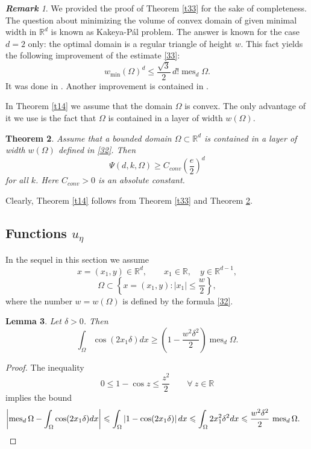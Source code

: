 \documentclass[a4paper,12pt]{article}
\numberwithin{equation}{section}
\def \de{\delta}
\def \O{\Omega}
\def \R{\mathbb{R}}
\def\mes{\operatorname{mes}}
\newcommand{\<}{\langle}
\renewcommand{\>}{\rangle}
\theoremstyle{plain}
\newtheorem{theorem}{\bf Theorem}[section]
\newtheorem{lemma}[theorem]{\bf Lemma}
\theoremstyle{definition}
\theoremstyle{remark}
\newtheorem{rem}[theorem]{\bf Remark}
\renewcommand{\le}{\leqslant}
\renewcommand{\ge}{\geqslant}
\begin{document}
\begin{rem}
We provided the proof of Theorem \ref{t33} for the sake of completeness.
The question about minimizing the volume of convex domain of given minimal width in $\R^d$
is known as Kakeya-P\'al problem.
The answer is known \cite{Pal} for the case $d=2$ only:
the optimal domain is a regular triangle of height $w$.
This fact yields the following improvement of the estimate \eqref{33}:
$$
w_{\min} (\O)^d \le \frac{\sqrt 3}2\, d! \mes_d \O.
$$
It was done in \cite{Firey}.
Another improvement is contained in \cite[the proof of Theorem 6.2]{Bezdek}.
\end{rem}

In Theorem \ref{t14} we assume that the domain $\O$ is convex.
The only advantage of it we use is the fact that $\O$ is contained in a layer
of width $w(\O)$.

\begin{theorem}
\label{t335}
Assume that a bounded domain $\O \subset \R^d$ is contained in a layer
of width $w(\O)$ defined in \eqref{32}.
Then 
\begin{equation*} 
\Psi (d,k,\O) \ge C_{conv} \left(\frac{e}2\right)^d 
\end{equation*}
for all $k$.
Here $C_{conv}>0$ is an absolute constant.
\end{theorem}

Clearly, Theorem \ref{t14} follows from Theorem \ref{t33} and Theorem \ref{t335}.

\subsection{Functions $u_\eta$}
In the sequel in this section we assume
$$
x = (x_1, y) \in \R^d, \qquad x_1 \in \R, \quad y \in \R^{d-1},
$$
$$
\O \subset\left\{x = (x_1, y) : |x_1| \le \frac{w}2\right\},
$$
where the number $w = w(\O)$ is defined by the formula \eqref{32}.

\begin{lemma}
\label{l36}
Let $\de > 0$.
Then
$$
\int_\O \cos (2 x_1 \de) dx \ge \left(1 - \frac{w^2\de^2}2\right) \mes_d \O.
$$
\end{lemma}

\begin{proof}
The inequality
$$
0 \le 1 - \cos z \le \frac{z^2}2 \qquad \forall \ z \in \R
$$
implies the bound
$$
\left| \mes_d \O - \int_\O \cos (2 x_1 \de) dx\right|
\le \int_\O \left|1-\cos (2 x_1 \de)\right| dx
\le \int_\O 2 x_1^2 \de^2 dx
\le \frac{w^2\de^2}2\, \mes_d \O.
\quad \qedhere
$$
\end{proof}
\end{document}
